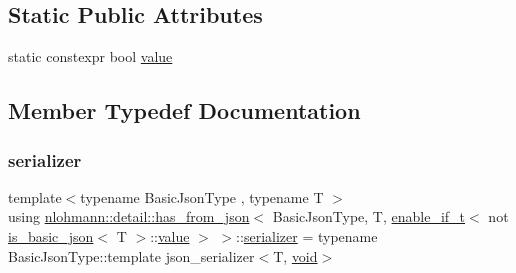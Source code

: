 \subsection*{Static Public Attributes}
\begin{DoxyCompactItemize}
\item 
static constexpr bool \hyperlink{structnlohmann_1_1detail_1_1has__from__json_3_01_basic_json_type_00_01_t_00_01enable__if__t_3_01e29213c543deddccc314d19cbaf9f3b4_afb638d592883301228bcad21d83bf4aa}{value}
\end{DoxyCompactItemize}


\subsection{Member Typedef Documentation}
\mbox{\label{structnlohmann_1_1detail_1_1has__from__json_3_01_basic_json_type_00_01_t_00_01enable__if__t_3_01e29213c543deddccc314d19cbaf9f3b4_ab17cea1be422b8985fc19942809560ed}} 
\subsubsection{\texorpdfstring{serializer}{serializer}}
{\footnotesize\ttfamily template$<$typename Basic\+Json\+Type , typename T $>$ \\
using \hyperlink{structnlohmann_1_1detail_1_1has__from__json}{nlohmann\+::detail\+::has\+\_\+from\+\_\+json}$<$ Basic\+Json\+Type, T, \hyperlink{namespacenlohmann_1_1detail_a02bcbc878bee413f25b985ada771aa9c}{enable\+\_\+if\+\_\+t}$<$ not \hyperlink{structnlohmann_1_1detail_1_1is__basic__json}{is\+\_\+basic\+\_\+json}$<$ T $>$\+::\hyperlink{structnlohmann_1_1detail_1_1has__from__json_3_01_basic_json_type_00_01_t_00_01enable__if__t_3_01e29213c543deddccc314d19cbaf9f3b4_afb638d592883301228bcad21d83bf4aa}{value} $>$ $>$\+::\hyperlink{structnlohmann_1_1detail_1_1has__from__json_3_01_basic_json_type_00_01_t_00_01enable__if__t_3_01e29213c543deddccc314d19cbaf9f3b4_ab17cea1be422b8985fc19942809560ed}{serializer} =  typename Basic\+Json\+Type\+::template json\+\_\+serializer$<$T, \hyperlink{namespacenlohmann_1_1detail_a59fca69799f6b9e366710cb9043aa77d}{void}$>$}



